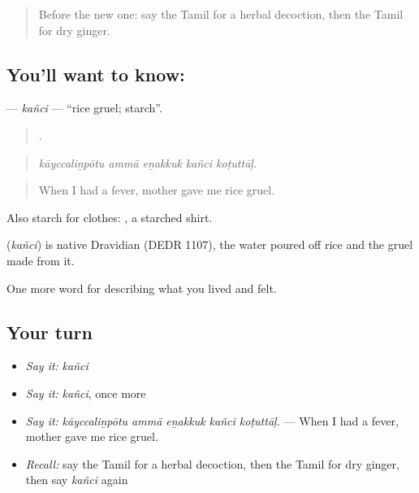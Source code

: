 \label{lesson:TA-C485-kanci}



\begin{quote}
Before the new one: say the Tamil for a herbal decoction, then the Tamil for dry ginger.
\end{quote}

\subsection*{You'll want to know: }
\textbf{} — \emph{kañci} — \textquotedblleft{}rice gruel; starch\textquotedblright{}.

\begin{quote}
    .
\end{quote}

\begin{quote}
\emph{kāyccaliṉpōtu ammā eṉakkuk kañci koṭuttāḷ.}
\end{quote}

\begin{quote}
When I had a fever, mother gave me rice gruel.
\end{quote}

Also starch for clothes:   , a starched shirt.

\begin{cousinweb}
\textbf{} (\emph{kañci}) is native Dravidian (DEDR 1107), the water poured off rice and the gruel made from it.
\end{cousinweb}

\begin{grammarlens}[title={What you've built}]
One more word for describing what you lived and felt.
\end{grammarlens}

\subsection*{Your turn}
\begin{itemize}
\raggedright
  \item \emph{Say it:} \emph{kañci}
  \item \emph{Say it:} \emph{kañci}, once more
  \item \emph{Say it:} \emph{kāyccaliṉpōtu ammā eṉakkuk kañci koṭuttāḷ.} — When I had a fever, mother gave me rice gruel.
  \item \emph{Recall:} say the Tamil for a herbal decoction, then the Tamil for dry ginger, then say \emph{kañci} again
\end{itemize}

